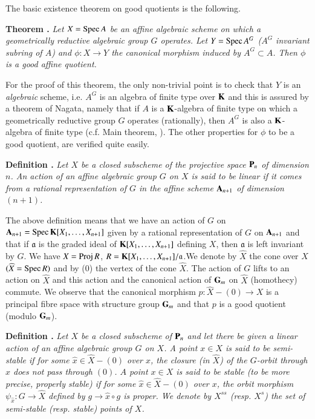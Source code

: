 The basic existence theorem on good quotients is the following.

\medskip
\noindent
{\bf Theorem .\label{art18-thm2}}
{\em Let $X=\operatorname{Spec} A$ be an affine algebraic scheme on which a geometrically reductive algebraic group $G$ operates. Let $Y=\operatorname{Spec} A^{G}$ ($A^{G}$ invariant subring of $A$) and $\phi:X\to Y$ the canonical morphism induced by $A^{G}\subset A$. Then $\phi$ is a good affine quotient.}
\smallskip

For the proof of this theorem, the only non-trivial point is to check that $Y$ is an {\em algebraic} scheme, i.e. $A^{G}$ is an algebra of finite type over $\mathbf{K}$ and this is assured by a theorem of Nagata, namely that if $A$ is a $\mathbf{K}$-algebra of finite type on which a geometrically reductive group $G$ operates (rationally), then $A^{G}$ is also a $\mathbf{K}$-algebra of finite type (c.f. Main theorem, \cite{art18-key6}). The other properties for $\phi$ to be a good quotient, are verified quite easily.

\medskip
\noindent
{\bf Definition .\label{art18-defi5}}
{\em Let $X$ be a closed subscheme of the projective space $\mathbf{P}_{n}$ of dimension $n$. An action of an affine algebraic group $G$ on $X$ is said to be linear if it comes from a rational representation of $G$ in the affine scheme $\mathbf{A}_{n+1}$ of dimension $(n+1)$.}
\smallskip

The above definition means that we have an action of $G$ on $\mathbf{A}_{n+1}=\operatorname{Spec} \mathbf{K}[X_{1},\ldots,X_{n+1}]$ given by a rational representation of $G$ on $\mathbf{A}_{n+1}$ and that if $\mathfrak{a}$ is the graded ideal of $\mathbf{K}[X_{1},\ldots,X_{n+1}]$ defining $X$, then $\mathfrak{a}$ is left invariant by $G$. We have $X=\operatorname{\mathrm{Proj}} R$, $R=\mathbf{K}[X_{1},\ldots,X_{n+1}]/\mathfrak{a}$.\pageoriginale We denote by $\widehat{X}$ the cone over $X$ $(\widehat{X}=\operatorname{Spec} R)$ and by (0) the vertex of the cone $\widehat{X}$. The action of $G$ lifts to an action on $\widehat{X}$ and this action and the canonical action of $\mathbf{G}_{m}$ on $\widehat{X}$ (homothecy) commute. We observe that the canonical morphism $p:\widehat{X}-(0)\to X$ is a principal fibre space with structure group $\mathbf{G}_{m}$ and that $p$ is a good quotient (modulo $\mathbf{G}_{m}$).

\medskip
\noindent
{\bf Definition .\label{art18-defi6}}
{\em Let $X$ be a closed subscheme of $\mathbf{P}_{n}$ and let there be given a linear action of an affine algebraic group $G$ on $X$. A point $x\in X$ is said to be semi-stable if for some $\widehat{x}\in \widehat{X}-(0)$ over $x$, the closure (in $\widehat{X}$) of the $G$-orbit through $\widehat{x}$ does not pass through $(0)$. $A$ point $x\in X$ is said to be stable (to be more precise, properly stable) if for some $\widehat{x}\in \widehat{X}-(0)$ over $x$, the orbit morphism $\psi_{\widehat{x}}:G\to \widehat{X}$ defined by $g\to \widehat{x}\circ g$ is proper. We denote by $X^{ss}$ (resp. $X^{s}$) the set of semi-stable (resp. stable) points of $X$.}
\smallskip


